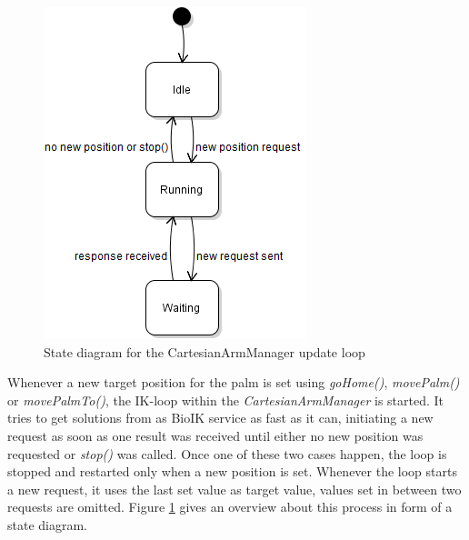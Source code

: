 \begin{figure}
	\caption{\label{fig:impl:cartarmstate}State diagram for the CartesianArmManager update loop}
	\includegraphics[width=\linewidth]{assets/chpt_impl/sw/CartesianArmManager_loop}
\end{figure}

Whenever a new target position for the palm is set using \textit{goHome()}, \textit{movePalm()} or \textit{movePalmTo()}, the IK-loop within the \textit{CartesianArmManager} is started. It tries to get solutions from as BioIK service as fast as it can, initiating a new request as soon as one result was received until either no new position was requested or \textit{stop()} was called. Once one of these two cases happen, the loop is stopped and restarted only when a new position is set. Whenever the loop starts a new request, it uses the last set value as target value, values set in between two requests are omitted. Figure \ref{fig:impl:cartarmstate} gives an overview about this process in form of a state diagram.

